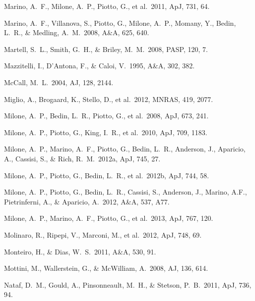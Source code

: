 \documentclass[12pt,preprint]{aastex}
\begin{document}
\begin{thebibliography}{}
Marino, A.~F., Milone, A.~P., Piotto, G., et al.~2011, ApJ, 731, 64.

Marino, A.~F., Villanova, S., Piotto, G., Milone, A.~P., Momany, Y., Bedin,
 L.~R., \& Medling, A.~M.~2008, A\&A, 625, 640.

Martell, S.~L., Smith, G.~H., \& Briley, M.~M.~2008, PASP, 120, 7.

Mazzitelli, I., D'Antona, F., \& Caloi, V.~1995, A\&A, 302, 382.

McCall, M.~L.~2004, AJ, 128, 2144.


Miglio, A., Brogaard, K., Stello, D., et al.~2012, MNRAS, 419, 2077.

Milone, A.~P., Bedin, L.~R., Piotto, G., et al.~2008, ApJ, 673, 241.

Milone, A.~P., Piotto, G., King, I.~R., et al.~2010, ApJ, 709, 1183.

Milone, A.~P., Marino, A.~F., Piotto, G., Bedin, L.~R., Anderson, J., Aparicio,
 A., Cassisi, S., \& Rich, R.~M.~2012a, ApJ, 745, 27.

Milone, A.~P., Piotto, G., Bedin, L.~R., et al.~2012b, ApJ, 744, 58.

Milone, A.~P., Piotto, G., Bedin, L.~R., Cassisi, S., Anderson, J., Marino,
 A.F., Pietrinferni, A., \& Aparicio, A.~2012, A\&A, 537, A77.

Milone, A.~P., Marino, A.~F., Piotto, G., et al.~2013, ApJ, 767, 120.

Molinaro, R., Ripepi, V., Marconi, M., et al.~2012, ApJ, 748, 69.

Monteiro, H., \& Dias, W.~S.~2011, A\&A, 530, 91.

Mottini, M., Wallerstein, G., \& McWilliam, A.~2008, AJ, 136, 614.

Nataf, D.~M., Gould, A., Pinsonneault, M.~H., \& Stetson, P.~B.~2011, ApJ,
 736, 94.


\end{thebibliography}
\end{document}
